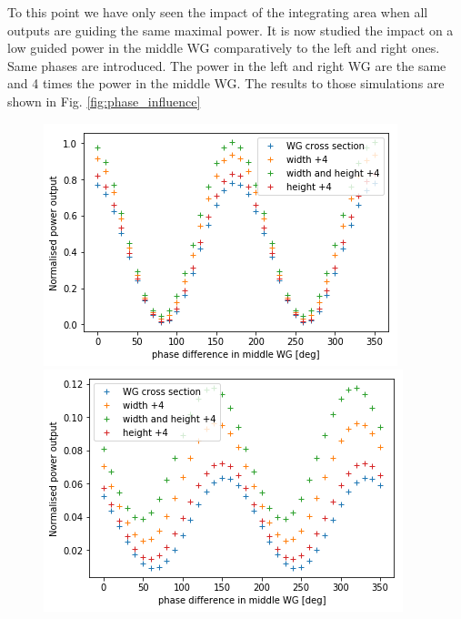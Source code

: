 To this point we have only seen the impact of the integrating area when all outputs are guiding the same maximal power. It is now studied the impact on a low guided power in the middle WG
comparatively to the left and right ones. Same phases are
introduced. The power in the left and right WG are the same and 4
times the power in the middle WG. The results to those simulations are
shown in Fig. \ref{fig:phase_influence}
\begin{figure}[htbp]
  \centering
  \begin{minipage}[b]{.33\textwidth}
    \centering
  \includegraphics[scale=.35]{picture/integrating_area/phase_python1.png}
  \end{minipage}%
  \hspace{0.2 cm}
  \begin{minipage}[b]{.33\textwidth}
    \centering   \includegraphics[scale=.35]{picture/integrating_area/phase_python2.png}
  \end{minipage}%
  \hspace{0.2 cm}

\end{figure}
